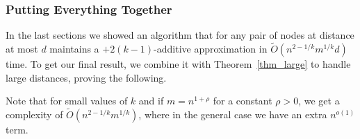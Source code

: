 
\subsubsection{Putting Everything Together} \label{sec_summary_additive}

In the last sections we showed an algorithm that for any pair of nodes at distance at most $d$ maintains a $+2(k-1)$-additive approximation in $\tilde{O}(n^{2-1/k}m^{1/k}d)$ time. To get our final result, we combine it with Theorem~\ref{thm_large} to handle large distances, proving the following.

\thmadd*


Note that for small values of $k$ and if $m=n^{1+\rho}$ for a constant $\rho>0$, we get a complexity of $\tilde{O}(n^{2-1/k}m^{1/k})$, where in the general case we have an extra $n^{o(1)}$ term.

